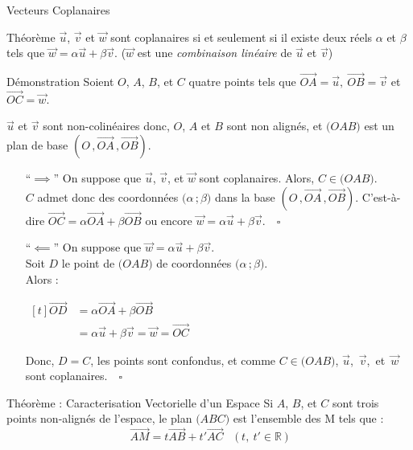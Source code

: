 \documentclass{coursbook}
\begin{document}
\begin{Gpartie}{Vecteurs Coplanaires}
\begin{Spartie}{Théorème}
            $\vec{u}$, $\vec{v}$ et $\vec{w}$ sont coplanaires si et seulement si il existe deux réels $\alpha$ et $\beta$ tels que $\vec{w}=\alpha\vec{u}+\beta\vec{v}$. \quad\big($\vec{w}$ est une \emph{combinaison linéaire} de $\vec{u}$ et $\vec{v}$\big)
            \begin{SSpartie}{Démonstration} 
                Soient $O$, $A$, $B$, et $C$ quatre points tels que $\overrightarrow{OA}=\vec{u},~\overrightarrow{OB}=\vec{v}$ et $\overrightarrow{OC}=\vec{w}$.

                $\vec{u}$ et $\vec{v}$ sont non-colinéaires donc, $O$, $A$ et $B$ sont non alignés, et $\big(OAB\big)$ est un plan de base $\left(O\,,\overrightarrow{OA}\,,\overrightarrow{OB}\right)$.
                \begin{itemize}[leftmargin=7ex]
                    \item[``$\implies$''] On suppose que $\vec{u}$, $\vec{v}$, et $\vec{w}$ sont coplanaires. Alors, $C\in\big(OAB\big)$. \\ $C$ admet donc des coordonnées $\big(\alpha\,;\beta\big)$ dans la base $\left(O\,,\overrightarrow{OA}\,,\overrightarrow{OB}\right)$. C'est-à-dire $\overrightarrow{OC}=\alpha\overrightarrow{OA}+\beta\overrightarrow{OB}$ ou encore $\vec{w}=\alpha\vec{u}+\beta\vec{v}$.$\quad\square$
                    \pagebreak 
                    \item[``$\impliedby$''] On suppose que $\vec{w}=\alpha\vec{u}+\beta\vec{v}$. \\ Soit $D$ le point de $\big(OAB\big)$ de coordonnées $\big(\alpha\,;\beta\big)$. \\ Alors : 
                     
                    $\begin{aligned}[t]
                        \overrightarrow{OD}&=\alpha\overrightarrow{OA}+\beta\overrightarrow{OB} \\
                        &=\alpha\vec{u}+\beta\vec{v}=\vec{w}=\overrightarrow{OC}
                    \end{aligned}$

                    Donc, $D=C$, les points sont confondus, et comme $C\in\big(OAB\big)$, $\vec{u}$,~$\vec{v}$,~et~$\vec{w}$ sont coplanaires.$\quad\square$
                \end{itemize}
            \end{SSpartie}
            \begin{SSpartie}{Théorème : Caracterisation Vectorielle d'un Espace} 
                Si $A$, $B$, et $C$ sont trois points non-alignés de l'espace, le plan $\big(ABC\big)$ est l'ensemble des M tels que : \[\overrightarrow{AM}=t\overrightarrow{AB}+t'\overrightarrow{AC}\quad\big(~t,~t'\in\mathbb{R}~\big)\]
            \end{SSpartie}
        \end{Spartie}
    \end{Gpartie}
\end{document}
